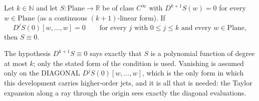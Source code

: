 \begin{lemma}
Let $k\in\mathbb{N}$ and let $S\colon\mathrm{Plane}\to\mathbb{R}$ be of class $C^{\infty}$ with
$D^{k+1}S(w)=0$ for every $w\in\mathrm{Plane}$ (as a continuous $(k+1)$-linear form).  If
\[
  D^{j}S(0)[w,\ldots,w]=0\qquad\text{for every }j\text{ with }0\le j\le k
  \text{ and every }w\in\mathrm{Plane},
\]
then $S\equiv0$.

The hypothesis $D^{k+1}S\equiv0$ says exactly that $S$ is a polynomial function of degree at most
$k$; only the stated form of the condition is used.  Vanishing is assumed only on the DIAGONAL
$D^{j}S(0)[w,\ldots,w]$, which is the only form in which this development carries higher-order
jets, and it is all that is needed: the Taylor expansion along a ray through the origin sees
exactly the diagonal evaluations.
\end{lemma}
